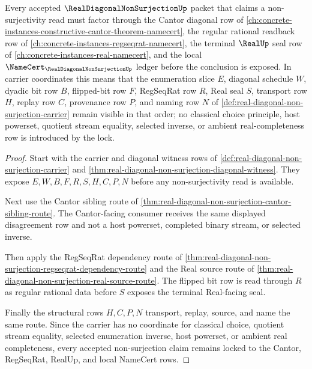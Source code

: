 \begin{theorem}
\label{thm:real-diagonal-non-surjection-cantor-regseqrat-lock}
Every accepted $\RealDiagonalNonSurjectionUp$ packet that claims a non-surjectivity read must factor through the Cantor diagonal row of \autoref{ch:concrete-instances-constructive-cantor-theorem-namecert}, the regular rational readback row of \autoref{ch:concrete-instances-regseqrat-namecert}, the terminal $\RealUp$ seal row of \autoref{ch:concrete-instances-real-namecert}, and the local $\NameCert_{\RealDiagonalNonSurjectionUp}$ ledger before the conclusion is exposed. In carrier coordinates this means that the enumeration slice $E$, diagonal schedule $W$, dyadic bit row $B$, flipped-bit row $F$, RegSeqRat row $R$, Real seal $S$, transport row $H$, replay row $C$, provenance row $P$, and naming row $N$ of \autoref{def:real-diagonal-non-surjection-carrier} remain visible in that order; no classical choice principle, host powerset, quotient stream equality, selected inverse, or ambient real-completeness row is introduced by the lock.
\end{theorem}
\begin{proof}
Start with the carrier and diagonal witness rows of \autoref{def:real-diagonal-non-surjection-carrier} and \autoref{thm:real-diagonal-non-surjection-diagonal-witness}. They expose $E,W,B,F,R,S,H,C,P,N$ before any non-surjectivity read is available.

Next use the Cantor sibling route of \autoref{thm:real-diagonal-non-surjection-cantor-sibling-route}. The Cantor-facing consumer receives the same displayed disagreement row and not a host powerset, completed binary stream, or selected inverse.

Then apply the RegSeqRat dependency route of \autoref{thm:real-diagonal-non-surjection-regseqrat-dependency-route} and the Real source route of \autoref{thm:real-diagonal-non-surjection-real-source-route}. The flipped bit row is read through $R$ as regular rational data before $S$ exposes the terminal Real-facing seal.

Finally the structural rows $H,C,P,N$ transport, replay, source, and name the same route. Since the carrier has no coordinate for classical choice, quotient stream equality, selected enumeration inverse, host powerset, or ambient real completeness, every accepted non-surjection claim remains locked to the Cantor, RegSeqRat, RealUp, and local NameCert rows.
\end{proof}
